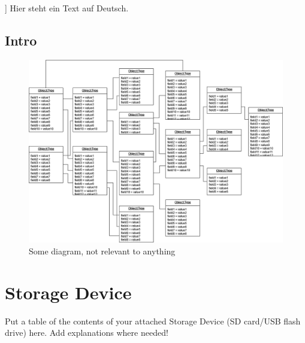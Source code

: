 \documentclass[
    german=false,
    thesistype=dissertation,
    nolistoffigures,
    nolistoftables,
]{tubsthesis}
\begin{document}
    \thesisabstract[%
        This is an english text.\\
        \lipsum[1-2]
    ]{%
        Hier steht ein Text auf Deutsch.\\
        \lipsum[3-4]
    }
    
    
    \begin{thesis}

        \chapter{Intro}

        \lipsum[1-3]

        \begin{figure}
        \centering
        \includegraphics[width=\textwidth]{images/example_diagram.png}
        \caption{Some diagram, not relevant to anything~\cite{lisa}}
        \label{fig:inga}
        \end{figure}

        \lipsum[4-7]

    \end{thesis}

    \chapter{Storage Device}
    Put a table of the contents of your attached Storage Device (SD card/USB flash drive) here.
    Add explanations where needed!
\end{document}
